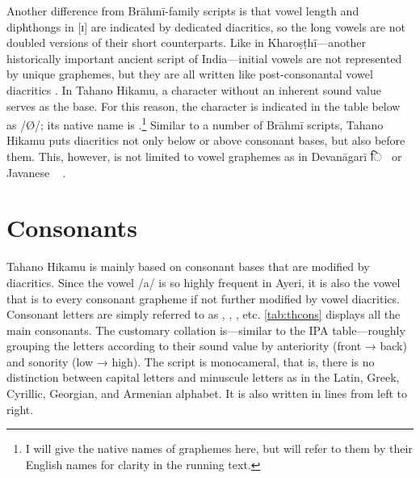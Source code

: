 Another difference from Brāhmī-family scripts is that vowel length and
diphthongs in [ɪ] are indicated by dedicated diacritics, so the long vowels are
not doubled versions of their short counterparts. Like in Kharoṣṭhī---another
historically important ancient script of India---initial vowels are not
represented by unique graphemes, but they are all written like post-consonantal
vowel diacritics \citep[377]{salomon1996}. In Tahano Hikamu, a character
without an inherent sound value serves as the base. For this reason, the
character is indicated in the table below as  /Ø/; its native name is
.\footnote{I will give the native names of
graphemes here, but will refer to them by their English names for clarity in
the running text.} Similar to a number of Brāhmī scripts, Tahano Hikamu puts
diacritics not only below or above consonant bases, but also before them. This,
however, is not limited to vowel graphemes as in Devanāgarī {\FS ि}~ or
Javanese ~ \citep[478]{kuipersmcdermott1996}.

\section{Consonants}

Tahano Hikamu is mainly based on consonant bases that are modified by
diacritics. Since the vowel /a/ is so highly frequent in Ayeri, it is also the
vowel that is  to every consonant grapheme if not further modified
by vowel diacritics. Consonant letters are simply referred to as ,
, , etc. \autoref{tab:thcons} displays all the main consonants.
The customary collation is---similar to the IPA table---roughly grouping the
letters according to their sound value by anteriority (front → back) and
sonority (low → high). The script is monocameral, that is, there is no
distinction between capital letters and minuscule letters as in the Latin,
Greek, Cyrillic, Georgian, and Armenian alphabet. It is also written in lines
from left to right.


